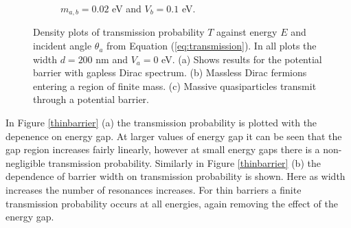 \begin{figure}
\begin{subfigure}{0.3\textwidth}
		\caption{$m_{a,b}=0.02$ eV and $V_{b}=0.1$ eV.}
	\end{subfigure}
	\caption{Density plots of transmission probability $T$ against energy $E$ and incident angle $\theta_{a}$ from Equation (\ref{eq:transmission}). In all plots the width $d=200$ nm and $V_{a}=0$ eV. (a) Shows results for the potential barrier with gapless Dirac spectrum. (b) Massless Dirac fermions entering a region of finite mass. (c) Massive quasiparticles transmit through a potential barrier.}
	\label{transmissionplot}
\end{figure}

				In Figure \ref{thinbarrier} (a) the transmission probability is plotted with the depenence on energy gap. At larger values of energy gap it can be seen that the gap region increases fairly linearly, however at small energy gaps there is a non-negligible transmission probability. Similarly in Figure \ref{thinbarrier} (b) the dependence of barrier width on transmission probability is shown. Here as width increases the number of resonances increases. For thin barriers a finite transmission probability occurs at all energies, again removing the effect of the energy gap.
